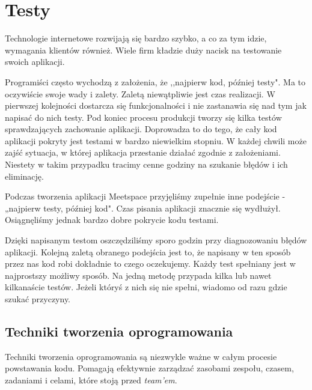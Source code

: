 \section{Testy}
  \label{testy}
  Technologie internetowe rozwijają się bardzo szybko, a co za tym idzie, wymagania klientów również. Wiele firm kładzie duży nacisk na testowanie swoich aplikacji.

  Programiści często wychodzą z założenia, że ,,najpierw kod, później testy". Ma to oczywiście swoje wady i zalety. Zaletą niewątpliwie jest czas realizacji. W pierwszej kolejności dostarcza się funkcjonalności i nie zastanawia się nad tym jak napisać do nich testy. Pod koniec procesu produkcji tworzy się kilka testów sprawdzających zachowanie aplikacji. Doprowadza to do tego, że cały kod aplikacji pokryty jest testami w bardzo niewielkim stopniu. W każdej chwili może zajść sytuacja, w której aplikacja przestanie działać zgodnie z założeniami. Niestety w takim przypadku tracimy cenne godziny na szukanie błędów i ich eliminację.

  Podczas tworzenia aplikacji Meetspace przyjęliśmy zupełnie inne podejście - „najpierw testy, później kod". Czas pisania aplikacji znacznie się wydłużył. Osiągnęliśmy jednak bardzo dobre pokrycie kodu testami.

  Dzięki napisanym testom oszczędziliśmy sporo godzin przy diagnozowaniu błędów aplikacji. Kolejną zaletą obranego podejścia jest to, że napisany w ten sposób przez nas kod robi dokładnie to czego oczekujemy. Każdy test spełniany jest w najprostszy możliwy sposób. Na jedną metodę przypada kilka lub nawet kilkanaście testów. Jeżeli któryś z nich się nie spełni, wiadomo od razu gdzie szukać przyczyny.

  \subsection{Techniki tworzenia oprogramowania}
    Techniki tworzenia oprogramowania są niezwykle ważne w całym procesie powstawania kodu. Pomagają efektywnie zarządzać zasobami zespołu, czasem, zadaniami i celami, które stoją przed \emph{team'em}.

